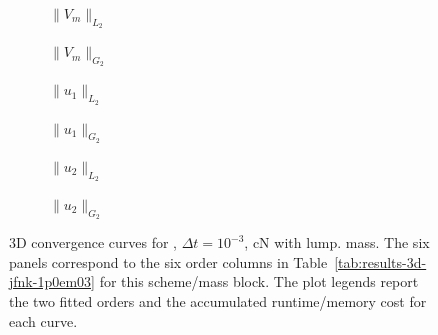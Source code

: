 \begin{figure}[p]
\centering
\begin{subfigure}{0.485\linewidth}
\centering
{}
\caption{$\|V_m\|_{L_2}$}
\label{fig:results-3d-jfnk-1p0em03-cranknicolson-lumped-a}
\end{subfigure}
\hfill
\begin{subfigure}{0.485\linewidth}
\centering
{}
\caption{$\|V_m\|_{G_2}$}
\label{fig:results-3d-jfnk-1p0em03-cranknicolson-lumped-b}
\end{subfigure}
\par\vspace{0.8em}
\begin{subfigure}{0.485\linewidth}
\centering
{}
\caption{$\|u_1\|_{L_2}$}
\label{fig:results-3d-jfnk-1p0em03-cranknicolson-lumped-c}
\end{subfigure}
\hfill
\begin{subfigure}{0.485\linewidth}
\centering
{}
\caption{$\|u_1\|_{G_2}$}
\label{fig:results-3d-jfnk-1p0em03-cranknicolson-lumped-d}
\end{subfigure}
\par\vspace{0.8em}
\begin{subfigure}{0.485\linewidth}
\centering
{}
\caption{$\|u_2\|_{L_2}$}
\label{fig:results-3d-jfnk-1p0em03-cranknicolson-lumped-e}
\end{subfigure}
\hfill
\begin{subfigure}{0.485\linewidth}
\centering
{}
\caption{$\|u_2\|_{G_2}$}
\label{fig:results-3d-jfnk-1p0em03-cranknicolson-lumped-f}
\end{subfigure}
\caption{3D convergence curves for , $\Delta t=10^{-3}$, cN with lump. mass. The six panels correspond to the six order columns in Table~\ref{tab:results-3d-jfnk-1p0em03} for this scheme/mass block. The plot legends report the two fitted orders and the accumulated runtime/memory cost for each curve.}
\label{fig:results-3d-jfnk-1p0em03-cranknicolson-lumped}
\end{figure}
\FloatBarrier


